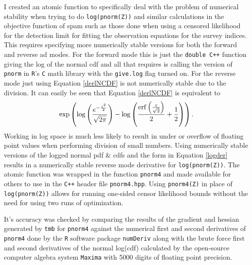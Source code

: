 \documentclass[11pt]{article}\usepackage[]{graphicx}\usepackage[]{color}
\begin{document}
\begin{appendices}
I created an atomic function to specifically deal with the problem of numerical stability when trying to do \texttt{log(pnorm(Z))} and similar calculations in the objective function of \acrshort{spam} such as those done when using a censored likelihood for the detection limit for fitting the observation equations for the survey indices. This requires specifying more numerically stable versions for both the forward and reverse \acrshort{ad} modes. For the forward mode this is just the \texttt{double C++} function giving the log of the normal \acrshort{cdf} and all that requires is calling the version of \texttt{pnorm} in \texttt{R}'s \texttt{C} math library with the \texttt{give.log} flag turned on. For the reverse mode just using Equation \ref{derlNCDF} is not numerically stable due to the division. It can easily be seen that Equation \ref{derlNCDF} is equivalent to 
\begin{equation}\label{logder}
	\exp \left (\log \left({{e^ {- {{z^2}\over{2}} }}\over{\sqrt{2\pi}}}
 \right) - \log \left({{\mathrm{erf}\left({{z}\over{\sqrt{2}}}\right)}\over{2
 }}+{{1}\over{2}}\right) \right).
\end{equation}
 Working in log space is much less likely to result in under or overflow of floating point values when performing division of small numbers. Using numerically stable versions of the logged normal \acrshort{pdf} \& \acrshort{cdf}s and the form in Equation \ref{logder} results in a numerically stable reverse mode derivative for \texttt{log(pnorm(Z))}. The atomic function was wrapped in the function \texttt{pnorm4} and made available for others to use in the \texttt{C++} header file \texttt{pnorm4.hpp}. Using \texttt{pnorm4(Z)} in place of \texttt{log(pnorm(Z))} allows for running one-sided censor likelihood bounds without the need for using two runs of optimization.
 
 It's accuracy was checked by comparing the results of the gradient and hessian generated by \texttt{\acrshort{tmb}} for \texttt{pnorm4} against the numerical first and second derivatives of \texttt{pnorm4} done by the \texttt{R} software package \texttt{numDeriv} along with the brute force first and second derivatives of the normal log(\acrshort{cdf}) calculated by the open-source computer algebra system \texttt{Maxima} with 5000 digits of floating point precision. 


\end{appendices}
\end{document}
